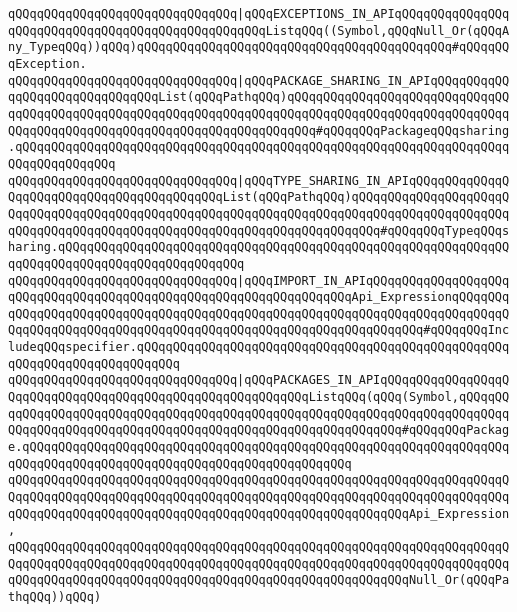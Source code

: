 \verb|qQQqqQQqqQQqqQQqqQQqqQQqqQQqqQQq|\verb#|qQQqEXCEPTIONS_IN_APIqQQqqQQqqQQqqQQqqQQqqQQqqQQqqQQqqQQqqQQqqQQqqQQqqQQqListqQQq((Symbol,qQQqNull_Or(qQQqAny_TypeqQQq))qQQq)qQQqqQQqqQQqqQQqqQQqqQQqqQQqqQQqqQQqqQQqqQQq#\verb|#qQQqqQQqException.|\newline
\verb|qQQqqQQqqQQqqQQqqQQqqQQqqQQqqQQq|\verb#|qQQqPACKAGE_SHARING_IN_APIqQQqqQQqqQQqqQQqqQQqqQQqqQQqqQQqList(qQQqPathqQQq)qQQqqQQqqQQqqQQqqQQqqQQqqQQqqQQqqQQqqQQqqQQqqQQqqQQqqQQqqQQqqQQqqQQqqQQqqQQqqQQqqQQqqQQqqQQqqQQqqQQqqQQqqQQqqQQqqQQqqQQqqQQqqQQqqQQqqQQqqQQqqQQq#\verb|#qQQqqQQqPackageqQQqsharing.qQQqqQQqqQQqqQQqqQQqqQQqqQQqqQQqqQQqqQQqqQQqqQQqqQQqqQQqqQQqqQQqqQQqqQQqqQQqqQQqqQQq|\newline
\verb|qQQqqQQqqQQqqQQqqQQqqQQqqQQqqQQq|\verb#|qQQqTYPE_SHARING_IN_APIqQQqqQQqqQQqqQQqqQQqqQQqqQQqqQQqqQQqqQQqqQQqList(qQQqPathqQQq)qQQqqQQqqQQqqQQqqQQqqQQqqQQqqQQqqQQqqQQqqQQqqQQqqQQqqQQqqQQqqQQqqQQqqQQqqQQqqQQqqQQqqQQqqQQqqQQqqQQqqQQqqQQqqQQqqQQqqQQqqQQqqQQqqQQqqQQqqQQqqQQq#\verb|#qQQqqQQqTypeqQQqsharing.qQQqqQQqqQQqqQQqqQQqqQQqqQQqqQQqqQQqqQQqqQQqqQQqqQQqqQQqqQQqqQQqqQQqqQQqqQQqqQQqqQQqqQQqqQQqqQQq|\newline
\verb|qQQqqQQqqQQqqQQqqQQqqQQqqQQqqQQq|\verb#|qQQqIMPORT_IN_APIqQQqqQQqqQQqqQQqqQQqqQQqqQQqqQQqqQQqqQQqqQQqqQQqqQQqqQQqqQQqqQQqqQQqApi_ExpressionqQQqqQQqqQQqqQQqqQQqqQQqqQQqqQQqqQQqqQQqqQQqqQQqqQQqqQQqqQQqqQQqqQQqqQQqqQQqqQQqqQQqqQQqqQQqqQQqqQQqqQQqqQQqqQQqqQQqqQQqqQQqqQQqqQQqqQQq#\verb|#qQQqqQQqIncludeqQQqspecifier.qQQqqQQqqQQqqQQqqQQqqQQqqQQqqQQqqQQqqQQqqQQqqQQqqQQqqQQqqQQqqQQqqQQqqQQqqQQq|\newline
\newline
\verb|qQQqqQQqqQQqqQQqqQQqqQQqqQQqqQQq|\verb#|qQQqPACKAGES_IN_APIqQQqqQQqqQQqqQQqqQQqqQQqqQQqqQQqqQQqqQQqqQQqqQQqqQQqqQQqqQQqListqQQq(qQQq(Symbol,qQQqqQQqqQQqqQQqqQQqqQQqqQQqqQQqqQQqqQQqqQQqqQQqqQQqqQQqqQQqqQQqqQQqqQQqqQQqqQQqqQQqqQQqqQQqqQQqqQQqqQQqqQQqqQQqqQQqqQQqqQQqqQQqqQQq#\verb|#qQQqqQQqPackage.qQQqqQQqqQQqqQQqqQQqqQQqqQQqqQQqqQQqqQQqqQQqqQQqqQQqqQQqqQQqqQQqqQQqqQQqqQQqqQQqqQQqqQQqqQQqqQQqqQQqqQQqqQQqqQQqqQQq|\newline
\verb|qQQqqQQqqQQqqQQqqQQqqQQqqQQqqQQqqQQqqQQqqQQqqQQqqQQqqQQqqQQqqQQqqQQqqQQqqQQqqQQqqQQqqQQqqQQqqQQqqQQqqQQqqQQqqQQqqQQqqQQqqQQqqQQqqQQqqQQqqQQqqQQqqQQqqQQqqQQqqQQqqQQqqQQqqQQqqQQqqQQqqQQqqQQqqQQqqQQqApi_Expression,|\newline
\verb|qQQqqQQqqQQqqQQqqQQqqQQqqQQqqQQqqQQqqQQqqQQqqQQqqQQqqQQqqQQqqQQqqQQqqQQqqQQqqQQqqQQqqQQqqQQqqQQqqQQqqQQqqQQqqQQqqQQqqQQqqQQqqQQqqQQqqQQqqQQqqQQqqQQqqQQqqQQqqQQqqQQqqQQqqQQqqQQqqQQqqQQqqQQqqQQqqQQqNull_Or(qQQqPathqQQq))qQQq)|\newline
